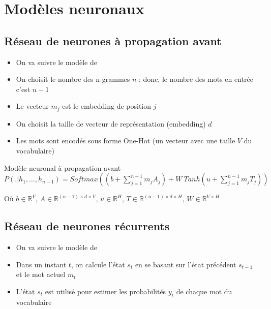 \documentclass{KodeBook}
\begin{document}
\section{Modèles neuronaux}

\subsection{Réseau de neurones à propagation avant}

\begin{itemize}
	\item On va suivre le modèle de \cite{2003-bengio-al}
	\item On choisit le nombre des n-grammes $n$ ; donc, le nombre des mots en entrée c'est $n-1$
	\item Le vecteur $m_j$ est le embedding de position $j$
	\item On choisit la taille de vecteur de représentation (embedding) $d$
	\item Les mots sont encodés sous forme One-Hot (un vecteur avec une taille $V$ du vocabulaire)
\end{itemize}

\begin{block}{Modèle neuronal à propagation avant}
	$
	P(.|h_1,\ldots, h_{n-1}) = 
	Softmax \left(
	(b + \sum\limits_{j=1}^{n-1} m_j A_j) 
	+ 
	W\ Tanh(u + \sum\limits_{j=1}^{n-1} m_j T_j)
	\right)
	$
	
	Où $b \in \mathbb{R}^{V},\, A \in \mathbb{R}^{(n-1) \times d \times V},\, u \in \mathbb{R}^{H},\, T \in \mathbb{R}^{(n-1) \times d \times H},\, W \in \mathbb{R}^{V \times H}$
\end{block}

\begin{figure}[ht]
	\centering
\end{figure}

\subsection{Réseau de neurones récurrents}

\begin{itemize}
	\item On va suivre le modèle de \cite{2010-mokolov-al}
	\item Dans un instant $t$, on calcule l'état $s_t$ en se basant sur l'état précédent $s_{t-1}$ et le mot actuel $m_t$
	\item L'état $s_t$ est utilisé pour estimer les probabilités $y_t$ de chaque mot du vocabulaire
\end{itemize}
\end{document}
